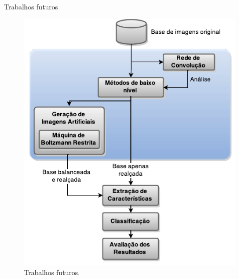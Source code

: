 \documentclass{beamer}
\begin{document}
\begin{frame}{Trabalhos futuros}
  \begin{figure}
    \includegraphics[height=0.75\textheight]{figuras/geral.pdf}
    \caption{Trabalhos futuros.}
  \end{figure}
\end{frame}
\end{document}
